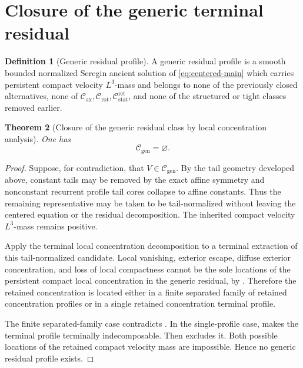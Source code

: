 \documentclass[11pt]{amsart}
\numberwithin{equation}{section}
\theoremstyle{plain}
\newtheorem{theorem}{Theorem}[section]
\theoremstyle{definition}
\newtheorem{definition}[theorem]{Definition}
\theoremstyle{remark}
\newcommand{\Cax}{\mathcal C_{\mathrm{ax}}}
\newcommand{\Crot}{\mathcal C_{\mathrm{rot}}}
\newcommand{\Cstat}{\mathcal C_{\mathrm{stat}}^{\mathrm{ret}}}
\newcommand{\Cgen}{\mathcal C_{\mathrm{gen}}}
\begin{document}
\section{Closure of the generic terminal residual}
\label{sec:R4-closure}

\begin{definition}[Generic residual profile]
\label{def:R4-profile-main}
A generic residual profile is a smooth bounded normalized Seregin ancient solution of
\eqref{eq:centered-main} which carries persistent compact velocity
\(L^3\)-mass and
belongs to none of the previously closed alternatives, none of
\(\Cax,\Crot,\Cstat\), and none of the structured or tight
classes removed earlier.
\end{definition}

\begin{theorem}[Closure of the generic residual class by local concentration analysis]
\label{thm:R4-final-closure}
One has
\[
   \Cgen=\varnothing .
\]
\end{theorem}

\begin{proof}
Suppose, for contradiction, that \(V\in\Cgen\).  By the tail geometry
developed above, constant tails may be removed by the exact affine symmetry
and nonconstant recurrent profile tail cores collapse to affine constants.
Thus the remaining representative may be taken to be tail-normalized without
leaving the centered equation or the residual decomposition.  The inherited compact
velocity \(L^3\)-mass remains positive.

Apply the terminal local concentration decomposition to a terminal extraction of this
tail-normalized candidate.  Local vanishing, exterior escape, diffuse exterior
concentration, and loss of local compactness cannot be the sole locations of the
persistent compact local concentration in the generic residual, by
.  Therefore the retained concentration
is located either in a finite separated family of retained concentration
profiles or in a single retained concentration terminal profile.

The finite separated-family case contradicts
.  In the single-profile case,
 makes the terminal profile terminally
indecomposable.  Then  excludes it.  Both possible
locations of the retained compact velocity mass are impossible.  Hence no
generic residual profile exists.
\end{proof}
\end{document}

